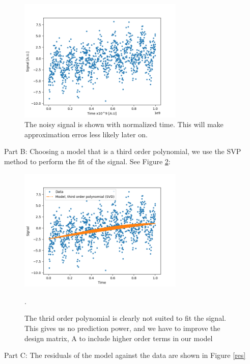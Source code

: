 \documentclass[11pt]{article}
\begin{document}
\begin{figure}[!htbp]
    \centering
    \includegraphics[width=0.7\textwidth]{time_series.png}
    \caption{The noisy signal is shown with normalized time. This will make approximation erros less likely later on.}
    \label{time_series}
\end{figure}

Part B: Choosing a model that is a third order polynomial, we use the SVP method to perform the fit of the signal. See Figure \ref{t3}:

\begin{figure}[!htbp]
    \centering
    \includegraphics[width=0.7\textwidth]{t3.png}
    \caption{The thrid order polynomial is clearly not suited to fit the signal. This gives us no prediction power, and we have to improve the design matrix, A to include higher order terms in our model}. 
    \label{t3}
\end{figure}

Part C:
The residuals of the model against the data are shown in Figure \ref{res}
\end{document}
